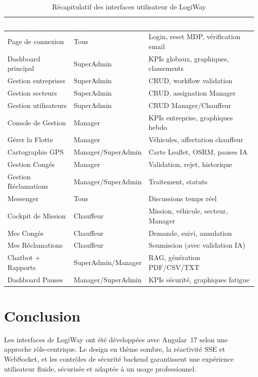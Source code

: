 \documentclass[12pt,a4paper]{report}
\newcommand{\thead}[1]{\cellcolor{tablehead}\textcolor{white}{\textbf{#1}}}
\begin{document}
\begin{table}[H]
  \centering
  \caption{Récapitulatif des interfaces utilisateur de LogiWay}
  \label{tab:interfaces}
  \begin{tabularx}{\textwidth}{|l|l|Y|}
    \hline
    \thead{Interface} & \thead{Rôle} & \thead{Modules couverts} \\
    \hline
    Page de connexion & Tous & Login, reset MDP, vérification email \\
    Dashboard principal & SuperAdmin & KPIs globaux, graphiques, classements \\
    Gestion entreprises & SuperAdmin & CRUD, workflow validation \\
    Gestion secteurs & SuperAdmin & CRUD, assignation Manager \\
    Gestion utilisateurs & SuperAdmin & CRUD Manager/Chauffeur \\
    Console de Gestion & Manager & KPIs entreprise, graphiques hebdo \\
    Gérer la Flotte & Manager & Véhicules, affectation chauffeur \\
    Cartographie GPS & Manager/SuperAdmin & Carte Leaflet, OSRM, pauses IA \\
    Gestion Congés & Manager & Validation, rejet, historique \\
    Gestion Réclamations & Manager/SuperAdmin & Traitement, statuts \\
    Messenger & Tous & Discussions temps réel \\
    Cockpit de Mission & Chauffeur & Mission, véhicule, secteur, Manager \\
    Mes Congés & Chauffeur & Demande, suivi, annulation \\
    Mes Réclamations & Chauffeur & Soumission (avec validation IA) \\
    Chatbot + Rapports & SuperAdmin/Manager & RAG, génération PDF/CSV/TXT \\
    Dashboard Pauses & Manager/SuperAdmin & KPIs sécurité, graphiques fatigue \\
    \hline
  \end{tabularx}
\end{table}

\section{Conclusion}

Les interfaces de LogiWay ont été développées avec Angular~17 selon une
approche rôle-centrique. Le design en thème sombre, la réactivité SSE et
WebSocket, et les contrôles de sécurité backend garantissent une expérience
utilisateur fluide, sécurisée et adaptée à un usage professionnel.
\end{document}
